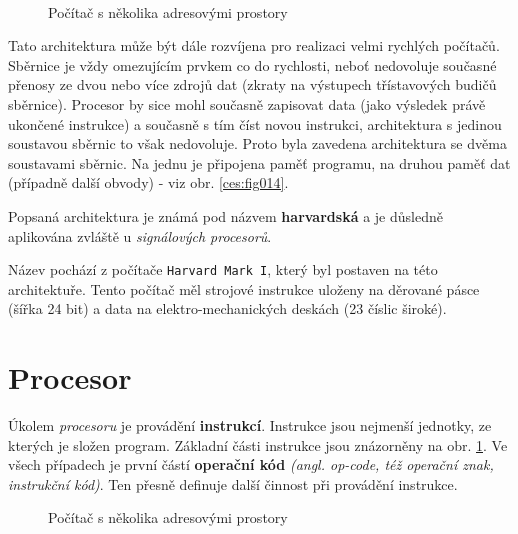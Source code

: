       \begin{figure}[ht!]
          {}         \\     
          {}           
        \caption{Počítač s několika adresovými prostory}
      \end{figure}
      
      Tato architektura může být dále rozvíjena pro realizaci velmi rychlých počítačů. Sběrnice je 
      vždy omezujícím prvkem co do rychlosti, neboť nedovoluje současné přenosy ze dvou nebo více 
      zdrojů dat (zkraty na výstupech třístavových budičů sběrnice). Procesor by sice mohl současně 
      zapisovat data (jako výsledek právě ukončené instrukce) a současně s tím číst novou 
      instrukci, architektura s jedinou soustavou sběrnic to však nedovoluje. Proto byla zavedena 
      architektura se dvěma soustavami sběrnic. Na jednu je připojena paměť programu, na druhou 
      paměť dat (případně další obvody) - viz obr. \ref{ces:fig014}.

      
      Popsaná architektura je známá pod názvem \textbf{harvardská} a je důsledně aplikována zvláště 
      u \emph{signálových procesorů}.
      
      Název pochází z počítače \texttt{Harvard Mark I}, který byl postaven na této architektuře. 
      Tento počítač měl strojové instrukce uloženy na děrované pásce (šířka 24 bit) a data na 
      elektro-mechanických deskách (23 číslic široké).      
      
  \section{Procesor}\label{ces:IchapIVsecII}
    Úkolem \emph{procesoru} je provádění \textbf{instrukcí}. Instrukce jsou nej\-men\-ší jednotky, 
    ze 
    kterých je složen program. Základní části instrukce jsou znázorněny na obr. 
    \ref{ces:fig015}. Ve všech případech je první částí \textbf{operační kód} \emph{(angl. 
    op-code, též operační znak, instrukční kód)}. Ten přesně definuje další činnost při provádění 
    instrukce.
    \begin{figure}[ht!] 
                  \vspace{1em}
                  \vspace{1em}
      \caption{Počítač s několika adresovými prostory}
      \label{ces:fig015}
    \end{figure}

